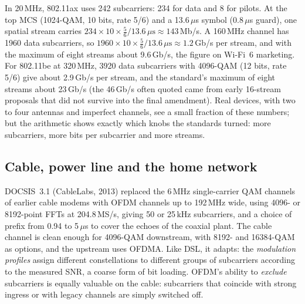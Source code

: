 
\begin{worked}
In 20\,MHz, 802.11ax uses 242 subcarriers: 234 for data and 8 for pilots. At the top MCS (1024-QAM, 10 bits,
rate 5/6) and a 13.6\,$\mu$s symbol (0.8\,$\mu$s guard), one spatial stream carries
$234\times10\times\tfrac56/13.6\,\mu\text{s}\approx143$\,Mb/s. A 160\,MHz channel has 1960 data subcarriers, so
$1960\times10\times\tfrac56/13.6\,\mu\text{s}\approx1.2$\,Gb/s per stream, and with the maximum of eight streams about
9.6\,Gb/s, the figure on Wi-Fi~6 marketing. For 802.11be at 320\,MHz, 3920 data subcarriers with 4096-QAM (12 bits,
rate 5/6) give about 2.9\,Gb/s per stream, and the standard's maximum of eight streams about 23\,Gb/s (the
46\,Gb/s often quoted came from early 16-stream proposals that did not survive into the final amendment). Real
devices, with two to four antennas and imperfect channels, see a small fraction of these numbers; but the
arithmetic shows exactly which knobs the standards turned: more subcarriers, more bits per subcarrier and more
streams.
\end{worked}

\subsection{Cable, power line and the home network}

DOCSIS~3.1 (CableLabs, 2013) replaced the 6\,MHz single-carrier QAM channels of earlier cable modems with OFDM
channels up to 192\,MHz wide, using 4096- or 8192-point FFTs at 204.8\,MS/s, giving 50 or 25\,kHz subcarriers,
and a choice of prefix from 0.94 to 5\,$\mu$s to cover the echoes of the coaxial plant. The cable channel is
clean enough for 4096-QAM downstream, with 8192- and 16384-QAM as options, and the upstream uses OFDMA. Like DSL,
it adapts: the \emph{modulation profiles} assign different constellations to different groups of subcarriers
according to the measured SNR, a coarse form of bit loading. OFDM's ability to \emph{exclude} subcarriers is
equally valuable on the cable: subcarriers that coincide with strong ingress or with legacy channels are simply
switched off.

